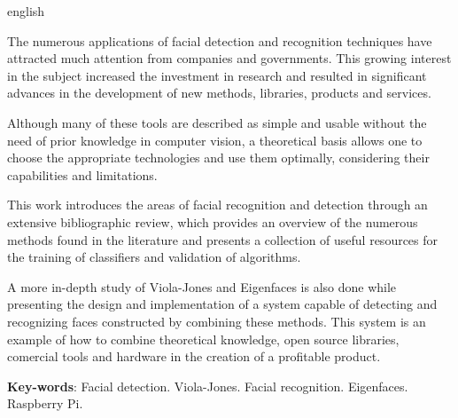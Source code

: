 \begin{resumo}[Abstract]
 \begin{otherlanguage*}{english}

The numerous applications of facial detection and recognition techniques have attracted much attention from companies and governments. This growing interest in the subject increased the investment in research and resulted in significant advances in the development of new methods, libraries, products and services.

Although many of these tools are described as simple and usable without the need of prior knowledge in computer vision, a theoretical basis allows one to choose the appropriate technologies and use them optimally, considering their capabilities and limitations.

This work introduces the areas of facial recognition and detection through an extensive bibliographic review, which provides an overview of the numerous methods found in the literature and presents a collection of useful resources for the training of classifiers and validation of algorithms.

A more in-depth study of Viola-Jones and Eigenfaces is also done while presenting the design and implementation of a system capable of detecting and recognizing faces constructed by combining these methods. This system is an example of how to combine theoretical knowledge, open source libraries, comercial tools and hardware in the creation of a profitable product.
   \vspace{\onelineskip}
 
   \noindent 
   \textbf{Key-words}: Facial detection. Viola-Jones. Facial recognition. Eigenfaces. Raspberry Pi.
 \end{otherlanguage*}
\end{resumo}

 

  

